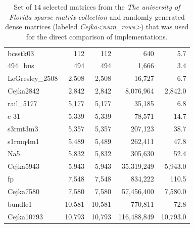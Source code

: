 \begin{table}[h!]
	\centering
	\begin{tabular}{|>{\footnotesize}l|>{\raggedleft\arraybackslash\footnotesize}r|>{\raggedleft\arraybackslash\footnotesize}r|>{\raggedleft\arraybackslash\footnotesize}r|>{\raggedleft\arraybackslash\footnotesize}r|}
		\hline
		\multicolumn{1}{|>{\centering\footnotesize}c|}{Matrix} & \multicolumn{1}{>{\centering\footnotesize}c|}{Rows} & \multicolumn{1}{>{\centering\footnotesize}c|}{Columns} & \multicolumn{1}{>{\centering\footnotesize}c|}{Nonzeros} & \multicolumn{1}{>{\centering\footnotesize}c|}{Avg. nonzeros per row} \\ \hline
		bcsstk03        &    112 &    112 &         640 &      5.7 \\
		494\_bus 		&    494 &    494 &       1,666 &      3.4 \\
		LeGresley\_2508 &  2,508 &  2,508 &      16,727 &      6.7 \\
		Cejka2842		&  2,842 &  2,842 &   8,076,964 &  2,842.0 \\
		rail\_5177      &  5,177 &  5,177 &      35,185 &      6.8 \\
		c-31		    &  5,339 &  5,339 &      78,571 &     14.7 \\
		s3rmt3m3        &  5,357 &  5,357 &     207,123 &     38.7 \\
		s1rmq4m1        &  5,489 &  5,489 &     262,411 &     47.8 \\
		Na5             &  5,832 &  5,832 &     305,630 &  	  52.4 \\
		Cejka5943		&  5,943 &  5,943 &  35,319,249 &  5,943.0 \\
		fp              &  7,548 &  7,548 &     834,222 &    110.5 \\
		Cejka7580		&  7,580 &  7,580 &  57,456,400 &  7,580.0 \\
		bundle1         & 10,581 & 10,581 &  	770,811 &     72.8 \\
		Cejka10793      & 10,793 & 10,793 & 116,488,849 & 10,793.0 \\ \hline
	\end{tabular}
	\caption{Set of $ 14 $ selected matrices from the \emph{The university of Florida sparse matrix collection} \cite{Davis2011} and randomly generated dense matrices (labeled \textit{Cejka<num\_rows>}) that was used for the direct comparison of implementations.}
	\label{Table:benchmark-results-matrices-used-for-benchmarks-14-selected-matrices}
\end{table}



